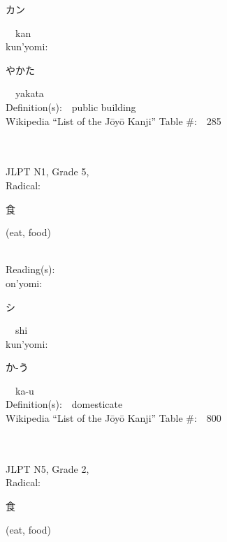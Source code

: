 \begin{multicols}{2}
{\hspace*{2em}}{\begin{CJK}{UTF8}{min} カン \end{CJK}}\ \ kan\ \ \\
{\hspace*{1em}}kun'yomi:\ \ \\
{\hspace*{2em}}{\begin{CJK}{UTF8}{min} やかた \end{CJK}}\ \ yakata\ \ \\
Definition(s):\ \ public building \\
Wikipedia ``List of the J\=oy\=o Kanji'' Table \#:\ \ 285 \\
\ \ \\
{\fontsize{34pt}{40pt}  }\ \ \\  %
{JLPT N1, Grade 5, \\Radical:\ \ {\begin{CJK}{UTF8}{min} 食 \end{CJK}} (eat, food) } \\
Reading(s):\ \ \\
{\hspace*{1em}}on'yomi:\ \ \\
{\hspace*{2em}}{\begin{CJK}{UTF8}{min} シ \end{CJK}}\ \ shi\ \ \\
{\hspace*{1em}}kun'yomi:\ \ \\
{\hspace*{2em}}{\begin{CJK}{UTF8}{min} か-う \end{CJK}}\ \ ka-u\ \ \\
Definition(s):\ \ domesticate \\
Wikipedia ``List of the J\=oy\=o Kanji'' Table \#:\ \ 800 \\
\ \ \\
{\fontsize{34pt}{40pt}  }\ \ \\  %
{JLPT N5, Grade 2, \\Radical:\ \ {\begin{CJK}{UTF8}{min} 食 \end{CJK}} (eat, food) } \\

\end{multicols}
